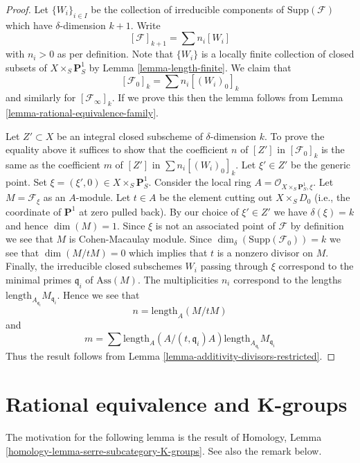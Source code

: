 \begin{proof}
Let $\{W_i\}_{i \in I}$ be the collection of irreducible
components of $\text{Supp}(\mathcal{F})$
which have $\delta$-dimension $k + 1$.
Write
$$
[\mathcal{F}]_{k + 1} = \sum n_i[W_i]
$$
with $n_i > 0$ as per definition. Note that $\{W_i\}$
is a locally finite collection of closed subsets of
$X \times_S \mathbf{P}^1_S$ by Lemma \ref{lemma-length-finite}.
We claim that
$$
[\mathcal{F}_0]_k = \sum n_i[(W_i)_0]_k
$$
and similarly for $[\mathcal{F}_\infty]_k$. If we prove this then the lemma
follows from Lemma \ref{lemma-rational-equivalence-family}.

\medskip\noindent
Let $Z' \subset X$ be an integral closed subscheme of $\delta$-dimension $k$.
To prove the equality above it suffices to show that the coefficient $n$
of $[Z']$ in $[\mathcal{F}_0]_k$ is the same as the coefficient $m$ of
$[Z']$ in $\sum n_i[(W_i)_0]_k$. Let $\xi' \in Z'$ be the generic point.
Set $\xi = (\xi', 0) \in  X \times_S \mathbf{P}^1_S$.
Consider the local ring $A = \mathcal{O}_{X \times_S \mathbf{P}^1_S, \xi}$.
Let $M = \mathcal{F}_\xi$ as an $A$-module.
Let $t \in A$ be the element cutting out $X \times_S D_0$
(i.e., the coordinate of $\mathbf{P}^1$ at zero pulled back).
By our choice of $\xi' \in Z'$ we have $\delta(\xi) = k$
and hence $\dim(M) = 1$. Since $\xi$ is not an associated point
of $\mathcal{F}$ by definition we see that $M$ is Cohen-Macaulay module.
Since $\dim_\delta(\text{Supp}(\mathcal{F}_0)) = k$
we see that $\dim(M/tM) = 0$ which implies that $t$
is a nonzero divisor on $M$. Finally, the irreducible closed subschemes
$W_i$ passing through $\xi$ correspond to the minimal primes
$\mathfrak q_i$ of $\text{Ass}(M)$. The multiplicities $n_i$ correspond
to the lengths $\text{length}_{A_{\mathfrak q_i}}M_{\mathfrak q_i}$.
Hence we see that
$$
n = \text{length}_A(M/tM)
$$
and
$$
m = \sum
\text{length}_A(A/(t, \mathfrak q_i)A) 
\text{length}_{A_{\mathfrak q_i}}M_{\mathfrak q_i}
$$
Thus the result follows from
Lemma \ref{lemma-additivity-divisors-restricted}.
\end{proof}





\section{Rational equivalence and K-groups}
\label{section-rational-equivalence-K-groups}

\noindent
The motivation for the following lemma is the result of
Homology, Lemma \ref{homology-lemma-serre-subcategory-K-groups}.
See also the remark below.

